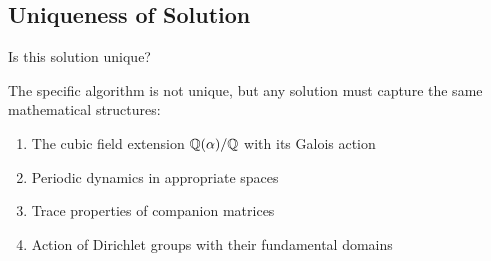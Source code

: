 \subsection{Uniqueness of Solution}

\begin{objection}
Is this solution unique?
\end{objection}

\begin{response}
The specific algorithm is not unique, but any solution must capture the same mathematical structures:
\begin{enumerate}
\item The cubic field extension $\mathbb{Q}(\alpha)/\mathbb{Q}$ with its Galois action
\item Periodic dynamics in appropriate spaces
\item Trace properties of companion matrices
\item Action of Dirichlet groups with their fundamental domains
\end{enumerate}
\end{response}
